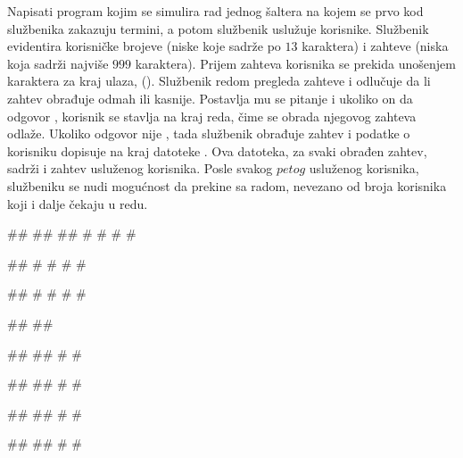 \begin{Exercise}[label=609]
Napisati program kojim se simulira rad jednog šaltera na kojem se prvo kod službenika zakazuju 
termini, a potom službenik uslužuje korisnike. 
Službenik evidentira korisničke  brojeve (niske koje sadrže po $13$ karaktera) i zahteve (niska koja sadrži najviše $999$ karaktera). 
Prijem zahteva korisnika se prekida unošenjem karaktera za kraj ulaza, ().
Službenik redom pregleda zahteve i odlučuje da li zahtev obrađuje odmah ili kasnije. Postavlja mu se pitanje 
 i ukoliko on da odgovor , 
korisnik se stavlja na kraj reda, čime se obrada njegovog zahteva odlaže. Ukoliko odgovor nije , tada službenik obrađuje zahtev i podatke o korisniku dopisuje na kraj datoteke . Ova datoteka, za svaki obrađen zahtev, sadrži  i zahtev usluženog korisnika.
Posle svakog $petog$ usluženog korisnika, službeniku se nudi mogućnost da prekine sa radom, nevezano od broja korisnika koji i dalje čekaju u redu. 

\begin{maxitest}
\begin{upotreba}{1}
#\naslovInt#
## 
##
# #
# #

##
# #
# #

##
# #
# #

##
##

##
##
# #

##
##
# #

##
##
# #

##
##
# #


\end{upotreba}
\end{maxitest}
\end{Exercise}
